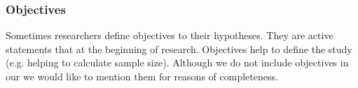\subsubsection{Objectives}

 Sometimes researchers define objectives to their hypotheses. They are active statements that  \cite[p. 280]{Farrugia2009} at the beginning of research. Objectives help to define the study (e.g. helping to calculate sample size). \cite{Farrugia2009,Vickers} Although we do not include objectives in our \briefingform we would like to mention them for reasons of completeness.